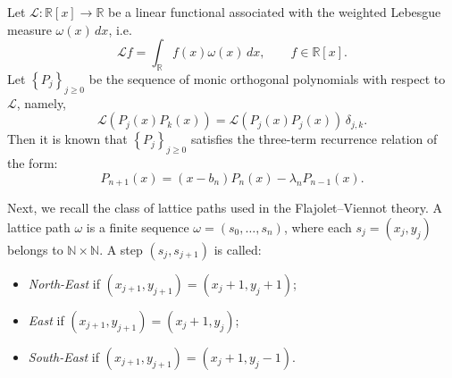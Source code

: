 \documentclass{amsart}
\def\R{\mathbb{R}}
\newcommand{\set}[1]{\left\{#1\right\}}
\theoremstyle{plain}
\theoremstyle{remark}
\numberwithin{equation}{section}
\begin{document}
Let $\mathcal{L}:\R[x]\rightarrow\R$ be a linear functional associated with the weighted Lebesgue measure $\omega(x)\,dx$, i.e. 
\begin{equation*}
    \mathcal{L}f=\int_{\R}f(x)\omega(x)\, dx, \qquad f\in\R[x].
\end{equation*}
Let $\set{P_j}_{j\geq0}$ be the sequence of monic orthogonal polynomials with respect to $\mathcal{L}$, namely,
\begin{equation}
\mathcal{L}( P_j(x) P_k(x) ) = \mathcal{L}( P_j(x) P_j(x) ) \, \delta_{j,k}. 
\end{equation}
Then it is known that $\set{P_{j}}_{j\geq0}$ satisfies the three-term recurrence relation of the form: 
\begin{equation} \label{def of three term general}
    P_{n+1}(x)=(x-b_{n})P_{n}(x)-\lambda_{n}P_{n-1}(x).
\end{equation} 

Next, we recall the class of lattice paths used in the Flajolet--Viennot theory. A lattice path $\omega$ is a finite sequence $\omega = (s_0, \dots, s_n)$, where each $s_j = (x_j, y_j)$ belongs to $\mathbb{N} \times \mathbb{N}$. A step $(s_j, s_{j+1})$ is called:
\begin{itemize}
    \item \emph{North-East} if $(x_{j+1}, y_{j+1}) = (x_j + 1, y_j + 1)$;
    \smallskip 
    \item \emph{East} if $(x_{j+1}, y_{j+1}) = (x_j + 1, y_j)$;
       \smallskip 
    \item \emph{South-East} if $(x_{j+1}, y_{j+1}) = (x_j + 1, y_j - 1)$.
\end{itemize}
\end{document}
